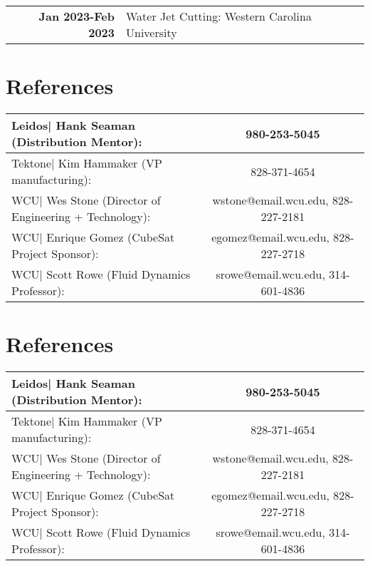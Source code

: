 \documentclass[allblack]{simplehipstercv}
\begin{document}
\begin{paracol}{2}
\begin{tabular}{>{\footnotesize\bfseries}r p{}}
    Jan 2023-Feb 2023 & Water Jet Cutting: Western Carolina University \\
\end{tabular}

\section*{References}
\begin{tabular}{l c}
    Leidos| Hank Seaman (Distribution Mentor): & 980-253-5045\\
    \hline
    Tektone| Kim Hammaker (VP manufacturing): & 828-371-4654\\
    \hline
    WCU| Wes Stone (Director of Engineering + Technology): & wstone@email.wcu.edu, 828-227-2181\\
    \hline
    WCU| Enrique Gomez (CubeSat Project Sponsor): & egomez@email.wcu.edu, 828-227-2718\\
    \hline
    WCU| Scott Rowe (Fluid Dynamics Professor): & srowe@email.wcu.edu, 314-601-4836
\end{tabular}

\section*{References}
\begin{tabular}{l c}
    Leidos| Hank Seaman (Distribution Mentor): & 980-253-5045\\
    \hline
    Tektone| Kim Hammaker (VP manufacturing): & 828-371-4654\\
    \hline
    WCU| Wes Stone (Director of Engineering + Technology): & wstone@email.wcu.edu, 828-227-2181\\
    \hline
    WCU| Enrique Gomez (CubeSat Project Sponsor): & egomez@email.wcu.edu, 828-227-2718\\
    \hline
    WCU| Scott Rowe (Fluid Dynamics Professor): & srowe@email.wcu.edu, 314-601-4836
\end{tabular}
\bigskip
\newpage

\end{paracol}
\end{document}

